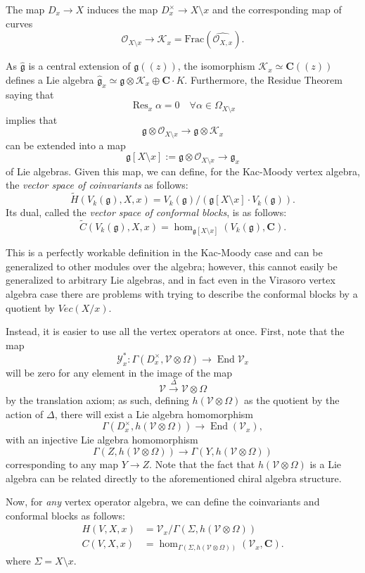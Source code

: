 \documentclass{article}
\newcommand{\CC}{\mathbold{C}}
\newcommand{\Oo}{\mathcal{O}}
\newcommand{\Kk}{\mathcal{K}}
\newcommand{\Vv}{\mathcal{V}}
\newcommand{\Yy}{\mathcal{Y}}
\newcommand{\gf}{\mathfrak{g}}
\newcommand{\ghat}{\widehat{\mathfrak{g}}}
\DeclareMathOperator{\Res}{Res}
\DeclareMathOperator{\End}{End}
\begin{document}
The map $D_x \rightarrow X$ induces the map $D^\times_x \rightarrow X \setminus x$ and the corresponding map of curves
\[\Oo_{X \setminus x} \rightarrow \Kk_x = \textrm{Frac}(\widehat{\Oo_{X,x}}). \]

As $\ghat$ is a central extension of $\gf((z))$, the isomorphism $\Kk_x \simeq \CC((z))$ defines a Lie algebra $\ghat_x \simeq \gf \otimes \Kk_x \oplus \CC \cdot K$.  Furthermore, the Residue Theorem saying that
\[\Res_x\alpha=0 \quad \forall \alpha \in \Omega_{X \setminus x} \]
implies that
\[\gf \otimes \Oo_{X \setminus x} \rightarrow \gf \otimes \Kk_x \]
can be extended into a map
\[\gf[X \setminus x]:=\gf \otimes \Oo_{X \setminus x} \rightarrow \gf_x \]
of Lie algebras.  Given this map, we can define, for the Kac-Moody vertex algebra, the \textit{vector space of coinvariants} as follows:
\[\widetilde{H}(V_k(\gf),X,x)=V_k(\gf) / (\gf[X \setminus x] \cdot V_k(\gf)). \]
Its dual, called the \textit{vector space of conformal blocks}, is as follows:
\[\widetilde{C}(V_k(\gf),X,x)=\hom_{\gf[X \setminus x]}(V_k(\gf),\CC). \]

This is a perfectly workable definition in the Kac-Moody case and can be generalized to other modules over the algebra; however, this cannot easily be generalized to arbitrary Lie algebras, and in fact even in the Virasoro vertex algebra case there are problems with trying to describe the conformal blocks by a quotient by $Vec(X/x)$.

Instead, it is easier to use all the vertex operators at once.  First, note that the map
\[\Yy_x^*: \Gamma(D_x^\times,\Vv \otimes \Omega) \rightarrow \End \Vv_x \]
will be zero for any element in the image of the map
\[\Vv \overset{\Delta}{\rightarrow} \Vv \otimes \Omega \]
by the translation axiom; as such, defining $h(\Vv \otimes \Omega)$ as the quotient by the action of $\Delta$, there will exist a Lie algebra homomorphism
\[\Gamma(D_x^\times,h(\Vv \otimes \Omega)) \rightarrow \End(\Vv_x), \]
with an injective Lie algebra homomorphism
\[\Gamma(Z,h(\Vv \otimes \Omega)) \rightarrow \Gamma(Y,h(\Vv \otimes \Omega)) \]
corresponding to any map $Y \rightarrow Z$.  Note that the fact that $h(\Vv \otimes \Omega)$ is a Lie algebra can be related directly to the aforementioned chiral algebra structure.

Now, for \textit{any} vertex operator algebra, we can define the coinvariants and conformal blocks as follows:
\begin{align}
  H(V,X,x)&=\Vv_x / \Gamma(\Sigma,h(\Vv \otimes \Omega))\\
  C(V,X,x)&=\hom_{\Gamma(\Sigma,h(\Vv \otimes \Omega))}(\Vv_x,\CC).
\end{align}
where $\Sigma=X \setminus x$.
\end{document}

